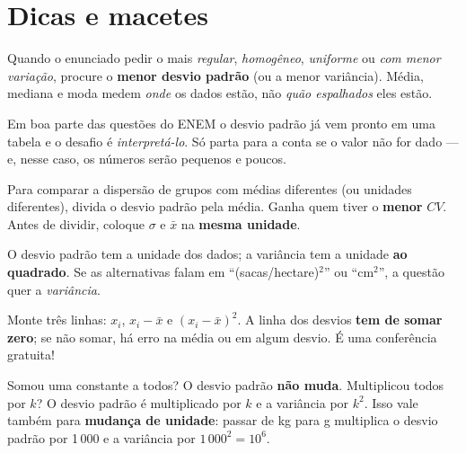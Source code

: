 \section{Dicas e macetes}

\begin{dica}[“Regular”, “homogêneo”, “estável” = pouca dispersão]
Quando o enunciado pedir o mais \emph{regular}, \emph{homogêneo}, \emph{uniforme} ou \emph{com menor
variação}, procure o \textbf{menor desvio padrão} (ou a menor variância). Média, mediana e moda medem
\emph{onde} os dados estão, não \emph{quão espalhados} eles estão.
\end{dica}

\begin{dica}
Em boa parte das questões do ENEM o desvio padrão já vem pronto em uma tabela e o desafio é
\emph{interpretá-lo}. Só parta para a conta se o valor não for dado — e, nesse caso, os números serão
pequenos e poucos.
\end{dica}

\begin{dica}
Para comparar a dispersão de grupos com médias diferentes (ou unidades diferentes), divida o desvio
padrão pela média. Ganha quem tiver o \textbf{menor} $CV$. Antes de dividir, coloque $\sigma$ e
$\bar{x}$ na \textbf{mesma unidade}.
\end{dica}

\begin{dica}
O desvio padrão tem a unidade dos dados; a variância tem a unidade \textbf{ao quadrado}. Se as
alternativas falam em “(sacas/hectare)$^2$” ou “cm$^2$”, a questão quer a \emph{variância}.
\end{dica}

\begin{macete}
Monte três linhas: $x_i$, $x_i - \bar{x}$ e $(x_i - \bar{x})^2$. A linha dos desvios
\textbf{tem de somar zero}; se não somar, há erro na média ou em algum desvio. É uma conferência
gratuita!
\end{macete}

\begin{macete}
Somou uma constante a todos? O desvio padrão \textbf{não muda}. Multiplicou todos por $k$? O desvio
padrão é multiplicado por $k$ e a variância por $k^2$. Isso vale também para \textbf{mudança de
unidade}: passar de kg para g multiplica o desvio padrão por 1\,000 e a variância por
$1\,000^2 = 10^6$.
\end{macete}

